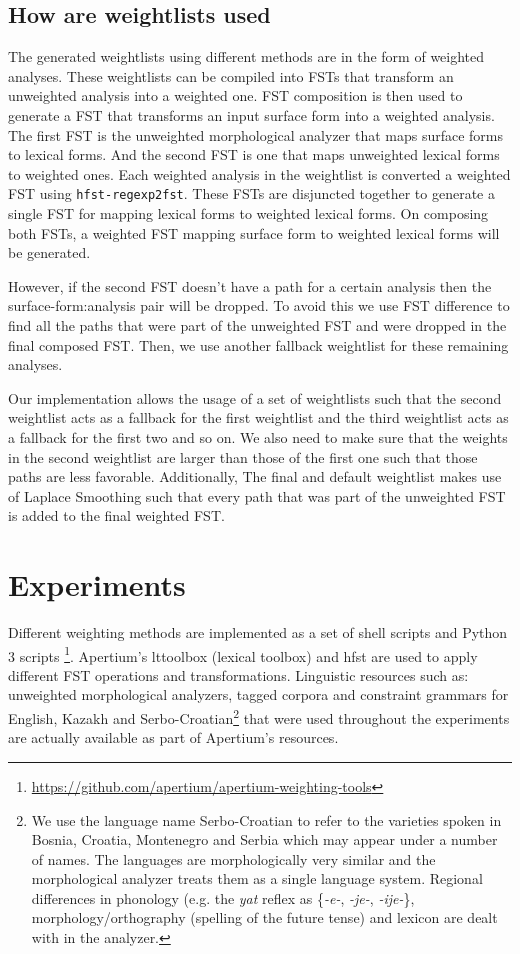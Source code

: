 \documentclass[free]{flammie}
\begin{document}
\subsection{How are weightlists used}
The generated weightlists using different methods are in the form of weighted
analyses.  These weightlists can be compiled into FSTs that transform an
unweighted analysis into a weighted one.  FST composition is then used to
generate a FST that transforms an input surface form into a weighted analysis.
The first FST is the unweighted morphological analyzer that maps surface forms
to lexical forms.  And the second FST is one that maps unweighted lexical forms
to weighted ones.  Each weighted analysis in the weightlist is converted a
weighted FST using \texttt{hfst-regexp2fst}.  These FSTs are disjuncted together
to generate a single FST for mapping lexical forms to weighted lexical forms.
On composing both FSTs, a weighted FST mapping surface form to weighted lexical
forms will be generated.

However, if the second FST doesn't have a path for a certain analysis then the
surface-form:analysis pair will be dropped.  To avoid this we use FST difference
to find all the paths that were part of the unweighted FST and were dropped in
the final composed FST.  Then, we use another fallback weightlist for these
remaining analyses.

Our implementation allows the usage of a set of weightlists such that the second
weightlist acts as a fallback for the first weightlist and the third weightlist
acts as a fallback for the first two and so on. We also need to make sure that
the weights in the second weightlist are larger than those of the first one such
that those paths are less favorable.  Additionally, The final and default
weightlist makes use of Laplace Smoothing such that every path that was part of
the unweighted FST is added to the final weighted FST.

\section{Experiments}
Different weighting methods are implemented as a set of shell scripts and Python
3 scripts \footnote{\url{https://github.com/apertium/apertium-weighting-tools}}.
Apertium's lttoolbox (lexical toolbox) and hfst are used to apply different FST
operations and transformations. Linguistic resources such as: unweighted
morphological analyzers, tagged corpora and constraint grammars for English,
Kazakh \cite{Washington2014Finite} and Serbo-Croatian\footnote{We use the
language name Serbo-Croatian to refer to the varieties spoken in Bosnia,
Croatia, Montenegro and Serbia which may appear under a number of names. The
languages are morphologically very similar and the morphological analyzer treats
them as a single language system. Regional differences in phonology (e.g. the
\emph{yat} reflex as \{\emph{-e-}, \emph{-je-}, \emph{-ije-}\},
morphology/orthography (spelling of the future tense) and lexicon are dealt with
in the analyzer.} that were used throughout the experiments are actually
available as part of Apertium's resources.
\end{document}

